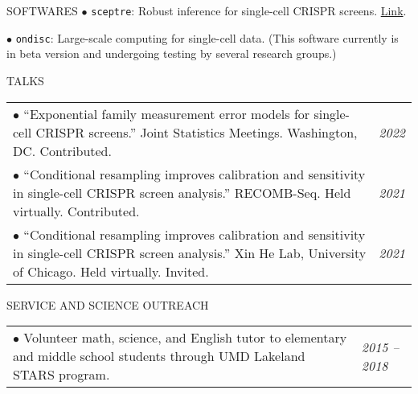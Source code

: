 \documentclass{resume} %
\begin{document}
\begin{rSection}{SOFTWARES}
	$\bullet$ \texttt{sceptre}: Robust inference for single-cell CRISPR screens. \href{https://katsevich-lab.github.io/sceptre/}{Link}.
	
	$\bullet$ \texttt{ondisc}: Large-scale computing for single-cell data. (This software currently is in beta version and undergoing testing by several research groups.)
\end{rSection}

\begin{rSection}{TALKS}
	
	\begin{tabular}{p{14cm}R{2.5cm}}
		$\bullet$ ``Exponential family measurement error models for single-cell CRISPR screens.'' Joint Statistics Meetings. Washington, DC. Contributed.  & \it{2022} \\
		
		$\bullet$  ``Conditional resampling improves calibration and sensitivity in single-cell CRISPR screen analysis.'' RECOMB-Seq. Held virtually. Contributed. & \it{2021} \\
		
		$\bullet$ ``Conditional resampling improves calibration and sensitivity in single-cell CRISPR screen analysis.'' Xin He Lab, University of Chicago. Held virtually. Invited. & \it{2021}
	\end{tabular}
	
\end{rSection}

\begin{rSection}{SERVICE AND SCIENCE OUTREACH}
	\begin{tabular}{p{14cm}R{2.5cm}}
		$\bullet$ Volunteer math, science, and English tutor to elementary and middle school students through UMD Lakeland STARS program. & \it{2015 -- 2018}  \\ 
	\end{tabular} 
\end{rSection}
\end{document}
